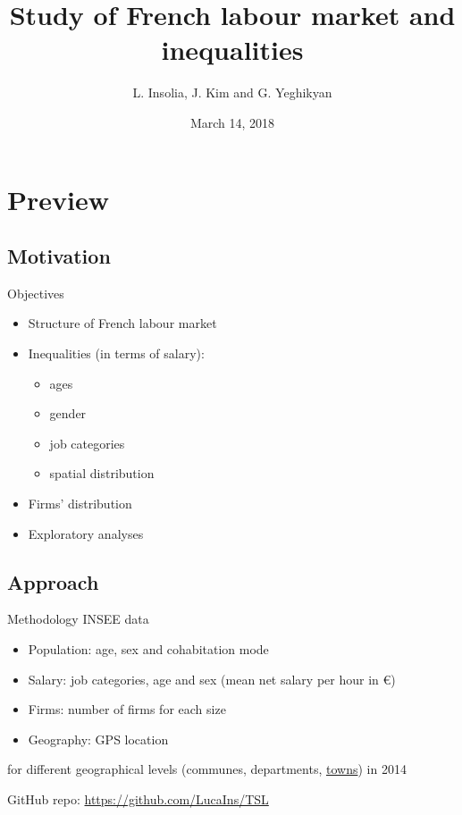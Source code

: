 \documentclass[12pt]{beamer}
\title[Study of French labour market and inequalities]{Study of French labour market and inequalities}
\author{L. Insolia, J. Kim and G. Yeghikyan}
\institute{SNS \\
		   \vskip0.5cm\centering\small \textcolor{rscuro}{--- \emph{Midterm results} ---}}
\date{March 14, 2018}
\begin{document}
	
\begin{frame}
	
	\maketitle
\end{frame}


\section{Preview}

\subsection{Motivation}

\begin{frame}{\textcolor{bscuro}{Objectives}}
	\begin{itemize}
		\item Structure of French labour market 
		\item Inequalities (in terms of salary): 
		\begin{itemize}
			\item ages 
			\item gender
			\item job categories
			\item spatial distribution
		\end{itemize}
		\item Firms' distribution
		\item Exploratory analyses
	\end{itemize}
\end{frame}
		

\subsection{Approach}

\begin{frame}{\textcolor{bscuro}{Methodology}}
	INSEE data
	\begin{itemize}
		\item Population: age, sex and cohabitation mode
		\item Salary: job categories, age and sex (mean net salary per hour in \euro)
		\item Firms: number of firms for each size
		\item Geography: GPS location
	\end{itemize}
	for different geographical levels (communes, departments, \underline{towns}) in 2014
	
	
	\vskip1cm GitHub repo: \textcolor{bscuro}{\url{https://github.com/LucaIns/TSL}} %
\end{frame}
				
\end{document}
